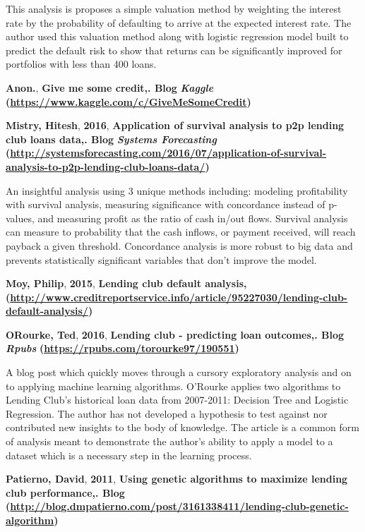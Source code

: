 \documentclass[conference,final,]{IEEEtran}
\begin{document}
This analysis is proposes a simple valuation method by weighting the
interest rate by the probability of defaulting to arrive at the expected
interest rate. The author used this valuation method along with logistic
regression model built to predict the default risk to show that returns
can be significantly improved for portfolios with less than 400 loans.

\textbf{Anon.}, \textbf{Give me some credit,}\textbf{. Blog}
\textbf{\emph{Kaggle}}\textbf{
(\url{https://www.kaggle.com/c/GiveMeSomeCredit})}

\textbf{Mistry, Hitesh}, \textbf{2016}, \textbf{Application of survival
analysis to p2p lending club loans data,}\textbf{. Blog}
\textbf{\emph{Systems Forecasting}}\textbf{
(\url{http://systemsforecasting.com/2016/07/application-of-survival-analysis-to-p2p-lending-club-loans-data/})}

An insightful analysis using 3 unique methods including: modeling
profitability with survival analysis, measuring significance with
concordance instead of p-values, and measuring profit as the ratio of
cash in/out flows. Survival analysis can measure to probability that the
cash inflows, or payment received, will reach payback a given threshold.
Concordance analysis is more robust to big data and prevents
statistically significant variables that don't improve the model.

\textbf{Moy, Philip}, \textbf{2015}, \textbf{Lending club default
analysis, }\textbf{
(\url{http://www.creditreportservice.info/article/95227030/lending-club-default-analysis/})}

\textbf{ORourke, Ted}, \textbf{2016}, \textbf{Lending club - predicting
loan outcomes,}\textbf{. Blog} \textbf{\emph{Rpubs}}\textbf{
(\url{https://rpubs.com/torourke97/190551})}

A blog post which quickly moves through a cursory exploratory analysis
and on to applying machine learning algorithms. O'Rourke applies two
algorithms to Lending Club's historical loan data from 2007-2011:
Decision Tree and Logistic Regression. The author has not developed a
hypothesis to test against nor contributed new insights to the body of
knowledge. The article is a common form of analysis meant to demonstrate
the author's ability to apply a model to a dataset which is a necessary
step in the learning process.

\textbf{Patierno, David}, \textbf{2011}, \textbf{Using genetic
algorithms to maximize lending club performance,}\textbf{. Blog}\textbf{
(\url{http://blog.dmpatierno.com/post/3161338411/lending-club-genetic-algorithm})}
\end{document}
